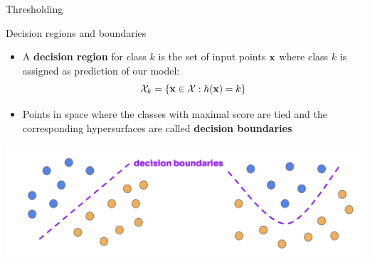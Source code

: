 \documentclass[11pt,compress,t,notes=noshow, xcolor=table]{beamer}
\begin{document}
\begin{frame}{Thresholding}

\end{frame} 

\begin{vbframe}{Decision regions and boundaries}
\begin{itemize}
  \item A \textbf{decision region} for class $k$ is the set of input points $\mathbf{x}$ where class $k$ is assigned as prediction of our model:
$$
\mathcal{X}_k = \{\mathbf{x} \in \mathcal{X} : h(\mathbf{x}) = k\}
$$

\item Points in space where the classes with maximal score are tied and the corresponding hypersurfaces are called \textbf{decision boundaries}
\end{itemize}

\begin{center}
  \includegraphics{figure_man/decision_boundaries.png} 
\end{center}
\end{vbframe} 
\end{document}
